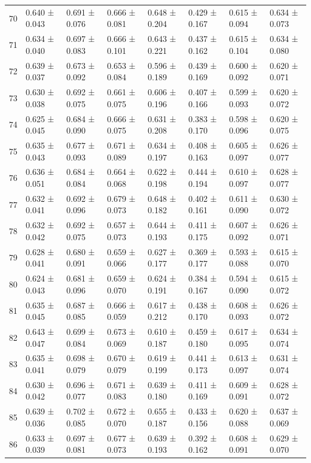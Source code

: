 \begin{tabular}{llllllll}
70 & 0.640 ± 0.043 & 0.691 ± 0.076 & 0.666 ± 0.081 & 0.648 ± 0.204 & 0.429 ± 0.167 & 0.615 ± 0.094 & 0.634 ± 0.073 \\
71 & 0.634 ± 0.040 & 0.697 ± 0.083 & 0.666 ± 0.101 & 0.643 ± 0.221 & 0.437 ± 0.162 & 0.615 ± 0.104 & 0.634 ± 0.080 \\
72 & 0.639 ± 0.037 & 0.673 ± 0.092 & 0.653 ± 0.084 & 0.596 ± 0.189 & 0.439 ± 0.169 & 0.600 ± 0.092 & 0.620 ± 0.071 \\
73 & 0.630 ± 0.038 & 0.692 ± 0.075 & 0.661 ± 0.075 & 0.606 ± 0.196 & 0.407 ± 0.166 & 0.599 ± 0.093 & 0.620 ± 0.072 \\
74 & 0.625 ± 0.045 & 0.684 ± 0.090 & 0.666 ± 0.075 & 0.631 ± 0.208 & 0.383 ± 0.170 & 0.598 ± 0.096 & 0.620 ± 0.075 \\
75 & 0.635 ± 0.043 & 0.677 ± 0.093 & 0.671 ± 0.089 & 0.634 ± 0.197 & 0.408 ± 0.163 & 0.605 ± 0.097 & 0.626 ± 0.077 \\
76 & 0.636 ± 0.051 & 0.684 ± 0.084 & 0.664 ± 0.068 & 0.622 ± 0.198 & 0.444 ± 0.194 & 0.610 ± 0.097 & 0.628 ± 0.077 \\
77 & 0.632 ± 0.041 & 0.692 ± 0.096 & 0.679 ± 0.073 & 0.648 ± 0.182 & 0.402 ± 0.161 & 0.611 ± 0.090 & 0.630 ± 0.072 \\
78 & 0.632 ± 0.042 & 0.692 ± 0.075 & 0.657 ± 0.073 & 0.644 ± 0.193 & 0.411 ± 0.175 & 0.607 ± 0.092 & 0.626 ± 0.071 \\
79 & 0.628 ± 0.041 & 0.680 ± 0.091 & 0.659 ± 0.066 & 0.627 ± 0.177 & 0.369 ± 0.177 & 0.593 ± 0.088 & 0.615 ± 0.070 \\
80 & 0.624 ± 0.043 & 0.681 ± 0.096 & 0.659 ± 0.070 & 0.624 ± 0.191 & 0.384 ± 0.167 & 0.594 ± 0.090 & 0.615 ± 0.072 \\
81 & 0.635 ± 0.045 & 0.687 ± 0.085 & 0.666 ± 0.059 & 0.617 ± 0.212 & 0.438 ± 0.170 & 0.608 ± 0.093 & 0.626 ± 0.072 \\
82 & 0.643 ± 0.047 & 0.699 ± 0.084 & 0.673 ± 0.069 & 0.610 ± 0.187 & 0.459 ± 0.180 & 0.617 ± 0.095 & 0.634 ± 0.074 \\
83 & 0.635 ± 0.041 & 0.698 ± 0.079 & 0.670 ± 0.079 & 0.619 ± 0.199 & 0.441 ± 0.173 & 0.613 ± 0.097 & 0.631 ± 0.074 \\
84 & 0.630 ± 0.042 & 0.696 ± 0.077 & 0.671 ± 0.083 & 0.639 ± 0.180 & 0.411 ± 0.169 & 0.609 ± 0.091 & 0.628 ± 0.072 \\
85 & 0.639 ± 0.036 & 0.702 ± 0.085 & 0.672 ± 0.070 & 0.655 ± 0.187 & 0.433 ± 0.156 & 0.620 ± 0.088 & 0.637 ± 0.069 \\
86 & 0.633 ± 0.039 & 0.697 ± 0.081 & 0.677 ± 0.073 & 0.639 ± 0.193 & 0.392 ± 0.162 & 0.608 ± 0.091 & 0.629 ± 0.070 \\

\end{tabular}

